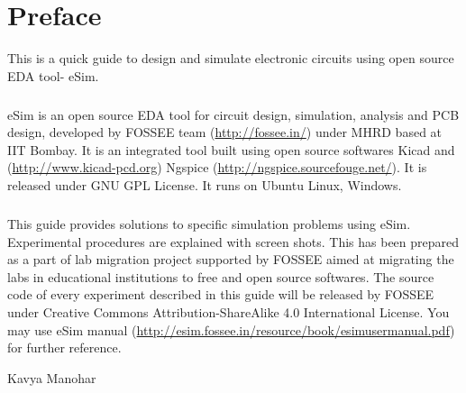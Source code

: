 \chapter*{Preface}

This is a quick guide to design and simulate electronic circuits using open source EDA tool- eSim. 
\paragraph{}

eSim is an open source EDA tool for circuit design, simulation, analysis and PCB design, developed by FOSSEE team (\url{http://fossee.in/}) under MHRD based at IIT Bombay. It is an integrated tool built using open source softwares Kicad and (\url{http://www.kicad-pcd.org}) Ngspice (\url{http://ngspice.sourcefouge.net/}). It is released under GNU GPL License. It runs on Ubuntu Linux, Windows.

\paragraph{}
This guide provides solutions to specific simulation problems using eSim. Experimental procedures are explained with screen shots. This has been prepared as a part of lab migration project supported by FOSSEE aimed at migrating the labs in educational institutions to free and open source softwares. The source code of every experiment described in this guide will be released by FOSSEE under Creative Commons Attribution-ShareAlike 4.0 International License. You may use eSim manual (\url{http://esim.fossee.in/resource/book/esimusermanual.pdf}) for further reference.


\begin{flushright} Kavya Manohar \end{flushright}

